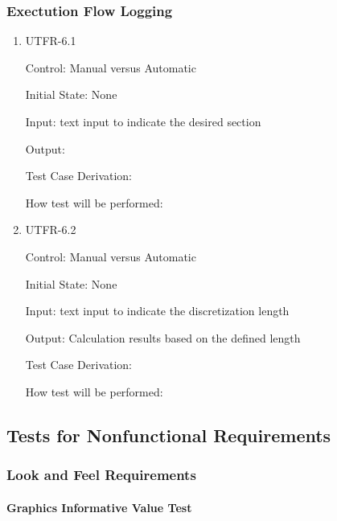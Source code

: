 \documentclass[12pt, titlepage]{article}
\begin{document}
\subsubsection{Exectution Flow Logging}

\begin{enumerate}

\item{UTFR-6.1\\}

Control: Manual versus Automatic
					
Initial State: None
					
Input: text input to indicate the desired section 
					
Output: 

Test Case Derivation: 

How test will be performed: 
					
\item{UTFR-6.2\\}

Control: Manual versus Automatic
					
Initial State: None
					
Input: text input to indicate the discretization length 
					
Output: Calculation results based on the defined length

Test Case Derivation: 

How test will be performed: 

\end{enumerate}


\subsection{Tests for Nonfunctional Requirements}



\subsubsection{Look and Feel Requirements}
		
\paragraph{Graphics Informative Value Test}
\end{document}
